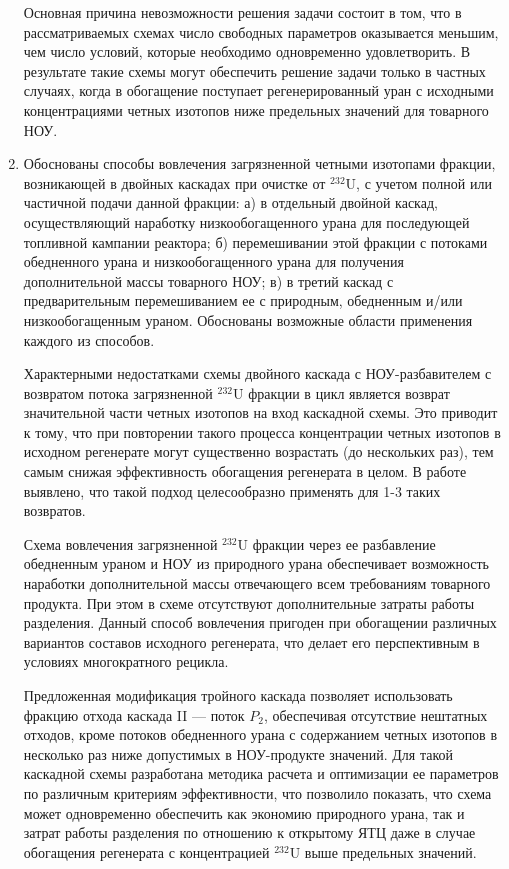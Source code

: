 \begin{enumerate}[label=\Roman*.]
Основная причина невозможности решения задачи состоит в том, что в рассматриваемых схемах число свободных параметров оказывается меньшим, чем число условий, которые необходимо одновременно удовлетворить. В результате такие схемы могут обеспечить решение задачи только в частных случаях, когда в обогащение поступает регенерированный уран с исходными концентрациями четных изотопов ниже предельных значений для товарного НОУ.

\item Обоснованы способы вовлечения загрязненной четными изотопами фракции, возникающей в двойных каскадах при очистке от $^{232}$U, с учетом полной или частичной подачи данной фракции: а) в отдельный двойной каскад, осуществляющий наработку низкообогащенного урана для последующей топливной кампании реактора; б) перемешивании этой фракции с потоками обедненного урана и низкообогащенного урана для получения дополнительной массы товарного НОУ; в) в третий каскад с предварительным перемешиванием ее с природным, обедненным и/или низкообогащенным ураном. Обоснованы возможные области применения каждого из способов.
 
Характерными недостатками схемы двойного каскада с НОУ-разбавителем с возвратом потока загрязненной $^{232}$U фракции в цикл является возврат значительной части четных изотопов на вход каскадной схемы. Это приводит к тому, что при повторении такого процесса концентрации четных изотопов в исходном регенерате могут существенно возрастать (до нескольких раз), тем самым снижая эффективность обогащения регенерата в целом. В работе выявлено, что такой подход целесообразно применять для 1-3 таких возвратов.
 
Схема вовлечения загрязненной $^{232}$U фракции через ее разбавление обедненным ураном и НОУ из природного урана обеспечивает возможность наработки дополнительной массы отвечающего всем требованиям товарного продукта. При этом в схеме отсутствуют дополнительные затраты работы разделения. Данный способ вовлечения пригоден при обогащении различных вариантов составов исходного регенерата, что делает его перспективным в условиях многократного рецикла.

Предложенная модификация тройного каскада позволяет использовать фракцию отхода каскада II --- поток $P_2$, обеспечивая отсутствие нештатных отходов, кроме потоков обедненного урана с содержанием четных изотопов в несколько раз ниже допустимых в НОУ-продукте значений. Для такой каскадной схемы разработана методика расчета и оптимизации ее параметров по различным критериям эффективности, что позволило показать, что схема может одновременно обеспечить как экономию природного урана, так и затрат работы разделения по отношению к открытому ЯТЦ даже в случае обогащения регенерата с концентрацией $^{232}$U выше предельных значений.


\end{enumerate}
